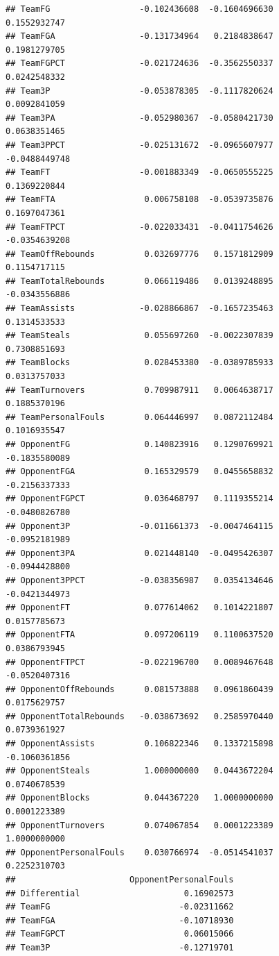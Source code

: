 \documentclass[
]{book}
\begin{document}
\begin{verbatim}
## TeamFG                  -0.102436608  -0.1604696630      0.1552932747
## TeamFGA                 -0.131734964   0.2184838647      0.1981279705
## TeamFGPCT               -0.021724636  -0.3562550337      0.0242548332
## Team3P                  -0.053878305  -0.1117820624      0.0092841059
## Team3PA                 -0.052980367  -0.0580421730      0.0638351465
## Team3PPCT               -0.025131672  -0.0965607977     -0.0488449748
## TeamFT                  -0.001883349  -0.0650555225      0.1369220844
## TeamFTA                  0.006758108  -0.0539735876      0.1697047361
## TeamFTPCT               -0.022033431  -0.0411754626     -0.0354639208
## TeamOffRebounds          0.032697776   0.1571812909      0.1154717115
## TeamTotalRebounds        0.066119486   0.0139248895     -0.0343556886
## TeamAssists             -0.028866867  -0.1657235463      0.1314533533
## TeamSteals               0.055697260  -0.0022307839      0.7308851693
## TeamBlocks               0.028453380  -0.0389785933      0.0313757033
## TeamTurnovers            0.709987911   0.0064638717      0.1885370196
## TeamPersonalFouls        0.064446997   0.0872112484      0.1016935547
## OpponentFG               0.140823916   0.1290769921     -0.1835580089
## OpponentFGA              0.165329579   0.0455658832     -0.2156337333
## OpponentFGPCT            0.036468797   0.1119355214     -0.0480826780
## Opponent3P              -0.011661373  -0.0047464115     -0.0952181989
## Opponent3PA              0.021448140  -0.0495426307     -0.0944428800
## Opponent3PPCT           -0.038356987   0.0354134646     -0.0421344973
## OpponentFT               0.077614062   0.1014221807      0.0157785673
## OpponentFTA              0.097206119   0.1100637520      0.0386793945
## OpponentFTPCT           -0.022196700   0.0089467648     -0.0520407316
## OpponentOffRebounds      0.081573888   0.0961860439      0.0175629757
## OpponentTotalRebounds   -0.038673692   0.2585970440      0.0739361927
## OpponentAssists          0.106822346   0.1337215898     -0.1060361856
## OpponentSteals           1.000000000   0.0443672204      0.0740678539
## OpponentBlocks           0.044367220   1.0000000000      0.0001223389
## OpponentTurnovers        0.074067854   0.0001223389      1.0000000000
## OpponentPersonalFouls    0.030766974  -0.0514541037      0.2252310703
##                       OpponentPersonalFouls
## Differential                     0.16902573
## TeamFG                          -0.02311662
## TeamFGA                         -0.10718930
## TeamFGPCT                        0.06015066
## Team3P                          -0.12719701

\end{verbatim}
\end{document}
